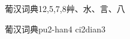 \begin{entry}{葡汉词典}{12,5,7,8}{⾋、⽔、⾔、⼋}
  \begin{phonetics}{葡汉词典}{pu2-han4 ci2dian3}
  \end{phonetics}
\end{entry}
